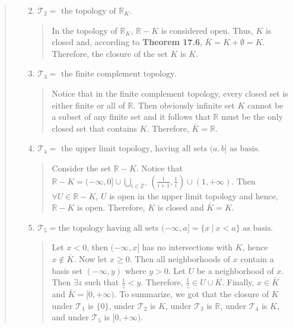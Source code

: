 \documentclass[12pt, a4paper]{article}
\newcommand{\pints}{\mathbb{Z}^+} %
\newcommand{\reals}{\mathbb{R}} %
\newcommand{\topology}{\mathcal{T}} %
\begin{document}
\begin{itemize}
\begin{itemize}
\begin{quote}
\begin{itemize}
\begin{quote}
\end{quote}

\item[]

\item[2.]
$\topology_2 = \mbox{ the topology of $\reals_K$.}$
\begin{quote}
In the topology of $\reals_K$, $\reals - K$ is considered open.
Thus, $K$ is closed and, according to \textbf{Theorem 17.6}, $\bar{K} = K + \emptyset = K$.
Therefore, the closure of the set $K$ is $K$.
\end{quote}

\item[]

\item[3.]
$\topology_3 = \mbox{ the finite complement topology.}$
\begin{quote}
Notice that in the finite complement topology,
every closed set is either finite or all of $\reals$.
Then obviously infinite set $K$ cannot be a subset of any finite set
and it follows that $\reals$ must be the only closed set that contains $K$.
Therefore, $\bar{K} = \reals$.
\end{quote}

\item[]

\item[4.]
$\topology_4 = \mbox{ the upper limit topology, having all sets $(a, b]$ as basis.}$
\begin{quote}
Consider the set $\reals - K$. Notice that $\reals - K = (-\infty, 0] \cup \bigcup_{i \in \pints}(\frac{1}{i + 1}, \frac{1}{i}) \cup (1, +\infty)$.
Then $\forall U \in \reals - K$, $U$ is open in the upper limit topology and hence, $\reals - K$ is open.
Therefore, $K$ is closed and $\bar{K} = K$.
\end{quote}

\item[]

\item[5.]
$\topology_5 = \mbox{the topology having all sets }(-\infty, a] = \{x \ | \ x < a\} \mbox{ as basis.}$
\begin{quote}
Let $x < 0$, then $(-\infty, x]$ has no intersections with $K$, hence $x \notin \bar{K}$. Now let $x \geq 0$. Then
all neighborhoods of $x$ contain a basis set $(-\infty, y)$
where $y > 0$. Let $U$ be a neighborhood of $x$. Then $\exists z$ such that $\frac{1}{z} < y$. Therefore, $\frac{1}{z} \in U \cup K$. Finally, $x \in \bar{K}$ and $\bar{K} = [0, +\infty)$.
\newline
\newline
To summarize, we got that the closure of $K$ under $\topology_1$ is $\{0\}$, under $\topology_2$ is $K$, under
$\topology_3$ is $\reals$, under $\topology_4$ is $K$,
and under $\topology_5$ is $[0, +\infty)$.
\end{quote}
\end{itemize}
\end{quote}


\end{itemize}
\end{itemize}
\end{document}
